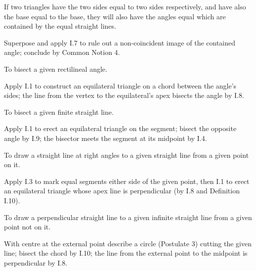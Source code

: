 \documentclass{rrxiv}
\begin{document}
\begin{claim}
\label{prop:I.8}
If two triangles have the two sides equal to two sides respectively,
and have also the base equal to the base, they will also have the
angles equal which are contained by the equal straight lines.
\end{claim}
\begin{evidence}[Proof of I.8]
\label{ev:I.8}
Superpose and apply I.7 to rule out a non-coincident image of the
contained angle; conclude by Common Notion 4.
\end{evidence}

\begin{claim}
\label{prop:I.9}
To bisect a given rectilineal angle.
\end{claim}
\begin{evidence}[Proof of I.9]
\label{ev:I.9}
Apply I.1 to construct an equilateral triangle on a chord between the
angle's sides; the line from the vertex to the equilateral's apex
bisects the angle by I.8.
\end{evidence}

\begin{claim}
\label{prop:I.10}
To bisect a given finite straight line.
\end{claim}
\begin{evidence}[Proof of I.10]
\label{ev:I.10}
Apply I.1 to erect an equilateral triangle on the segment; bisect the
opposite angle by I.9; the bisector meets the segment at its midpoint
by I.4.
\end{evidence}

\begin{claim}
\label{prop:I.11}
To draw a straight line at right angles to a given straight line from
a given point on it.
\end{claim}
\begin{evidence}[Proof of I.11]
\label{ev:I.11}
Apply I.3 to mark equal segments either side of the given point, then
I.1 to erect an equilateral triangle whose apex line is perpendicular
(by I.8 and Definition I.10).
\end{evidence}

\begin{claim}
\label{prop:I.12}
To draw a perpendicular straight line to a given infinite straight
line from a given point not on it.
\end{claim}
\begin{evidence}[Proof of I.12]
\label{ev:I.12}
With centre at the external point describe a circle (Postulate 3)
cutting the given line; bisect the chord by I.10; the line from the
external point to the midpoint is perpendicular by I.8.
\end{evidence}
\end{document}
